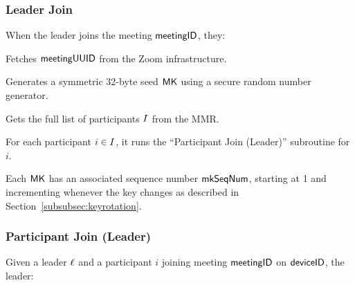 \subsubsection{Leader Join}\label{subsubsec:leaderjoin}

When the leader joins the meeting ${\sf meetingID}$, they:

\begingroup
\RaggedRight
\begin{enumerate*}
\item Fetches ${\sf meetingUUID}$ from the Zoom infrastructure.
\item Generates a symmetric 32-byte seed ${\sf MK}$ using a secure random number generator.
\item Gets the full list of participants $I$ from the MMR.
\item For each participant $i \in I$, it runs the ``Participant Join (Leader)'' subroutine for $i$.
\end{enumerate*}
\endgroup

Each ${\sf MK}$ has an associated sequence number $\mathsf{mkSeqNum}$, starting at 1 and incrementing
whenever the key changes as described in Section~\ref{subsubsec:keyrotation}.

\subsubsection{Participant Join (Leader)}
\label{subsubsec:participantjoinleader}

Given a leader $\ell$ and a participant $i$ joining meeting ${\sf meetingID}$ on ${\sf deviceID}$, the leader:

